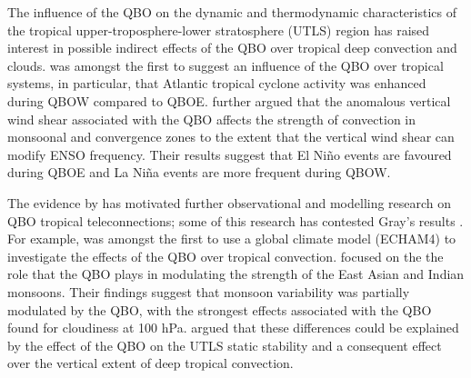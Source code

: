  The influence of the QBO on the dynamic and thermodynamic characteristics of the tropical upper-troposphere-lower stratosphere  (UTLS) region has raised interest in possible indirect effects of the QBO over tropical deep convection and clouds.
\cite{gray1984} was amongst the first to suggest an influence of the QBO over tropical systems, in particular, that Atlantic tropical cyclone activity was enhanced during QBOW compared to QBOE. 
\cite{gray1992} further argued that the anomalous vertical wind shear associated with the QBO affects the strength of convection in monsoonal and convergence zones to the extent that the vertical wind shear can modify ENSO frequency. Their results suggest that El Niño events are favoured during QBOE and  La Niña events are more frequent during QBOW.

The evidence by \cite{gray1992} has motivated further observational and modelling research on QBO tropical teleconnections; some of this research has contested Gray's results \citep[e.g.][]{chan1995,camargo2010,hansen2016tropospheric}. 
For example, \cite{giorgetta1999} was amongst the first to use a global climate model (ECHAM4) to investigate the effects of the QBO over tropical convection. \cite{giorgetta1999} focused on the the role that the QBO plays in modulating the strength of the East Asian and Indian monsoons. Their findings suggest that monsoon variability was partially modulated by the QBO, with the strongest effects associated with the QBO found for cloudiness at 100 hPa. \cite{giorgetta1999} argued that these differences could be explained by the effect of the QBO on the UTLS static stability and a consequent effect over the vertical extent of deep tropical convection. 

